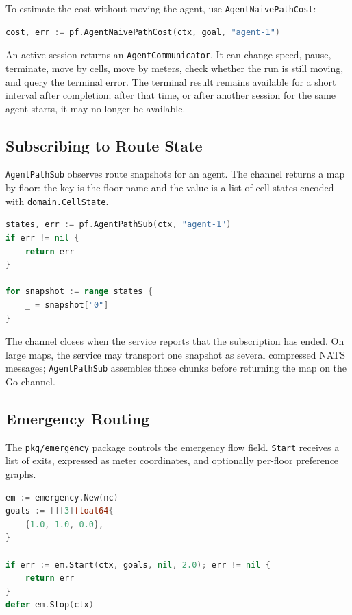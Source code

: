\documentclass[12pt,a4paper]{report}
\begin{document}
To estimate the cost without moving the agent, use
\texttt{AgentNaivePathCost}:

\begin{lstlisting}[language=Go]
cost, err := pf.AgentNaivePathCost(ctx, goal, "agent-1")
\end{lstlisting}

An active session returns an \texttt{AgentCommunicator}. It can change speed,
pause, terminate, move by cells, move by meters, check whether the run is still
moving, and query the terminal error. The terminal result remains available for
a short interval after completion; after that time, or after another session for
the same agent starts, it may no longer be available.

\subsection{Subscribing to Route State}

\texttt{AgentPathSub} observes route snapshots for an agent. The channel returns
a map by floor: the key is the floor name and the value is a list of cell states
encoded with \texttt{domain.CellState}.

\begin{lstlisting}[language=Go]
states, err := pf.AgentPathSub(ctx, "agent-1")
if err != nil {
    return err
}

for snapshot := range states {
    _ = snapshot["0"]
}
\end{lstlisting}

The channel closes when the service reports that the subscription has ended.
On large maps, the service may transport one snapshot as several compressed NATS
messages; \texttt{AgentPathSub} assembles those chunks before returning the map
on the Go channel.

\subsection{Emergency Routing}

The \texttt{pkg/emergency} package controls the emergency flow field.
\texttt{Start} receives a list of exits, expressed as meter coordinates, and
optionally per-floor preference graphs.

\begin{lstlisting}[language=Go]
em := emergency.New(nc)
goals := [][3]float64{
    {1.0, 1.0, 0.0},
}

if err := em.Start(ctx, goals, nil, 2.0); err != nil {
    return err
}
defer em.Stop(ctx)
\end{lstlisting}
\end{document}

